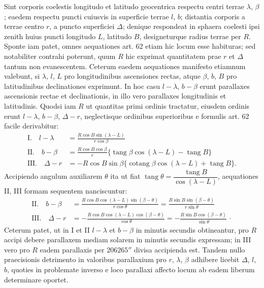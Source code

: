 Sint corporis coelestis longitudo et latitudo geocentrica respectu centri terrae $\lambda$, $\beta$; eaedem respectu puncti cuiusvis in superficie terrae $l$, $b$; distantia corporis a terrae centro $r$, a puncto superficiei $\Delta$; denique respondeat in sphaera coelesti ipsi zenith huius puncti longitudo $L$, latitudo $B$, designeturque radius terrae per $R$. Sponte iam patet, omnes aequationes art. 62 etiam hic locum esse habituras; sed notabiliter contrahi poterunt, quum $R$ hic exprimat quantitatem prae $r$ et $\Delta$ tantum non evanescentem. Ceterum eaedem aequationes manifesto etiamnum valebunt, si $\lambda$, $l$, $L$ pro longitudinibus ascensiones rectas, atque $\beta$, $b$, $B$ pro latitudinibus declinationes exprimunt. In hoc casu $l-\lambda$, $b-\beta$ erunt parallaxes ascensionis rectae et declinationis, in illo vero parallaxes longitudinis et latitudinis. Quodsi iam $R$ ut quantitas primi ordinis tractatur, eiusdem ordinis erunt $l-\lambda$, $b-\beta$, $\Delta-r$, neglectisque ordinibus superioribus e formulis art. 62 facile derivabitur:
\[
\begin{aligned}
\mathrm{I.}\quad l-\lambda&=\frac{R\cos B\sin(\lambda-L)}{r\cos\beta}\\[.5em]
\mathrm{II.}\quad b-\beta&=\frac{R\cos B\cos\beta}{r}\{\operatorname{tang}\beta\cos(\lambda-L)-\operatorname{tang}B\}\\[.5em]
\mathrm{III.}\quad \Delta-r&=-R\cos B\sin\beta\{\operatorname{cotang}\beta\cos(\lambda-L)+\operatorname{tang}B\}.
\end{aligned}
\]
\noindent Accipiendo angulum auxiliarem $\theta$ ita ut fiat $\operatorname{tang}\theta=\dfrac{\operatorname{tang}B}{\cos(\lambda-L)}$, aequationes II, III formam sequentem nanciscuntur:
\[
\begin{aligned}
\mathrm{II.}\quad b-\beta&=\frac{R\cos B\cos(\lambda-L)\sin(\beta-\theta)}{r\cos\theta}=\frac{R\sin B\sin(\beta-\theta)}{r\sin\theta}\\[.5em]
\mathrm{III.}\quad \Delta-r&=-\frac{R\cos B\cos(\lambda-L)\cos(\beta-\theta)}{\cos\theta}=-\frac{R\sin B\cos(\beta-\theta)}{\sin\theta}\,\cdot
\end{aligned}
\]
\noindent Ceterum patet, ut in I et II $l-\lambda$ et $b-\beta$ in minutis secundis obtineantur, pro $R$ accipi debere parallaxem mediam solarem in minutis secundis expressam; in III vero pro $R$ eadem parallaxis per $206265''$ divisa accipienda est. Tandem nullo praecisionis detrimento in valoribus parallaxium pro $r$, $\lambda$, $\beta$ adhibere licebit $\Delta$, $l$, $b$, quoties in problemate inverso e loco parallaxi affecto locum ab eadem liberum determinare oportet.

